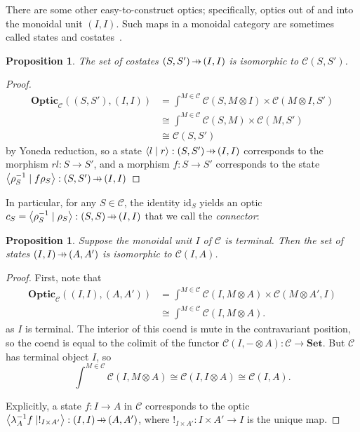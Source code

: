 \documentclass[11pt,letterpaper]{article}
\theoremstyle{plain}
\newtheorem{proposition}[theorem]{Proposition}
\theoremstyle{definition}
\newcommand{\C}{\mathscr{C}}
\newcommand{\Set}{\mathbf{Set}}
\newcommand{\Optic}{\mathbf{Optic}}
\newcommand{\id}{\mathrm{id}}
\newcommand{\rep}[2]{{\ensuremath \left\langle #1 \mid #2 \right\rangle}}
\newcommand{\hto}{\ensuremath{\,\mathaccent\shortmid\rightarrow\,}}
\newcommand{\todo}[1]{\textcolor{red}{\small #1}}
\begin{document}
There are some other easy-to-construct optics; specifically, optics out of  and into the monoidal unit $(I, I)$. Such maps in a monoidal category are sometimes called states and costates~\cite{CategoricalQuantumMechanics}.
\begin{proposition}\label{prop:costates}
  The set of costates $(S, S') \hto (I, I)$ is isomorphic to $\C(S, S')$.
\end{proposition}
\begin{proof}
  \begin{align*}
    \Optic_\C((S, S'), (I, I))
    &= \int^{M \in \C} \C(S, M \otimes I) \times \C(M \otimes I, S') \\
    &\cong \int^{M \in \C} \C(S, M) \times \C(M, S') \\
    &\cong \C(S, S')
  \end{align*}
  by Yoneda reduction, so a state $\rep{l}{r} : (S, S') \hto (I, I)$ corresponds to the morphism $rl : S \to S'$, and a morphism $f : S \to S'$ corresponds to the state $\rep{\rho_S^{-1}}{f \rho_S} : (S, S') \hto (I, I)$
\end{proof}


In particular, for any $S \in \C$, the identity $\id_S$ yields an optic $c_S = \rep{\rho_S^{-1}}{\rho_S} : (S, S) \hto (I, I)$ that we call the \emph{connector}:
%  
\begin{center}
  
\end{center}

\begin{proposition}\label{prop:states}
  Suppose the monoidal unit $I$ of $\C$ is terminal. Then the set of states $(I, I) \hto (A, A')$ is isomorphic to $\C(I, A)$.
\end{proposition}
\begin{proof}
  First, note that
  \begin{align*}
    \Optic_\C((I,I), (A,A'))
    &= \int^{M \in \C} \C(I, M \otimes A) \times \C(M \otimes A', I) \\
    &\cong \int^{M \in \C} \C(I, M \otimes A).
  \end{align*}
  as $I$ is terminal. The interior of this coend is mute in the contravariant position, so the coend is equal to the colimit of the functor $\C(I, - \otimes A) : \C \to \Set$. But $\C$ has terminal object $I$, so \[\int^{M \in \C} \C(I, M \otimes A) \cong \C(I, I \otimes A) \cong \C(I, A).\]
  
  Explicitly, a state $f : I \to A$ in $\C$ corresponds to the optic $\rep{\lambda_A^{-1} f}{!_{I \times A'}} : (I, I) \hto (A, A')$, where $!_{I \times A'} : I \times A' \to I$ is the unique map.
\end{proof}
\end{document}
